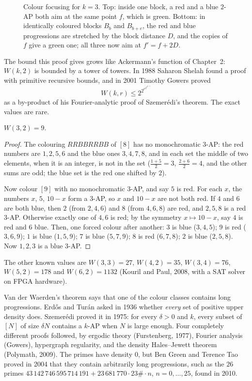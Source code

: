 \begin{figure}[ht]
\centering
{}
\caption{Colour focusing for $k=3$. Top: inside one block, a red and a blue $2$-AP both aim at the same point $f$, which is green. Bottom: in identically
coloured blocks $B_b$ and $B_{b+e}$, the red and blue progressions are stretched by the block distance $D$, and the copies of $f$ give a green one; all three now aim
at $f'=f+2D$.}
\label{extremal:fig:focusing}
\end{figure}

The bound this proof gives grows like Ackermann's function of Chapter~2: $W(k,2)$ is bounded by a tower of towers. In 1988 Saharon Shelah found a proof with
primitive recursive bounds, and in 2001 Timothy Gowers proved
\[
W(k,r)\le2^{2^{r^{2^{2^{k+9}}}}}
\]
as a by-product of his Fourier-analytic proof of Szemer\'edi's theorem. The exact values are rare.

\begin{proposition}\label{extremal:prop:w32}
$W(3,2)=9$.
\end{proposition}
\begin{proof}
The colouring $RRBBRRBB$ of $[8]$ has no monochromatic $3$-AP: the red numbers are $1,2,5,6$ and the blue ones $3,4,7,8$, and in each set the middle of two elements, when
it is an integer, is not in the set ($\frac{1+5}2=3$, $\frac{2+6}2=4$, and the other sums are odd; the blue set is the red one shifted by $2$).

Now colour $[9]$ with no monochromatic $3$-AP, and say $5$ is red. For each $x$, the numbers $x$, $5$, $10-x$ form a $3$-AP, so $x$ and $10-x$ are not both red. If $4$ and $6$ are
both blue, then $2$ (from $2,4,6$) and $8$ (from $4,6,8$) are red, and $2,5,8$ is a red $3$-AP. Otherwise exactly one of $4,6$ is red; by the symmetry $x\mapsto10-x$, say $4$
is red and $6$ blue. Then, one forced colour after another: $3$ is blue ($3,4,5$); $9$ is red ($3,6,9$); $1$ is blue ($1,5,9$); $7$ is blue ($5,7,9$); $8$ is red ($6,7,8$);
$2$ is blue ($2,5,8$). Now $1,2,3$ is a blue $3$-AP.
\end{proof}

The other known values are $W(3,3)=27$, $W(4,2)=35$, $W(3,4)=76$, $W(5,2)=178$ and $W(6,2)=1132$ (Kouril and Paul, 2008, with a SAT solver on FPGA hardware).

\begin{remark}
Van der Waerden's theorem says that one of the colour classes contains long progressions. Erd\H os and Tur\'an asked in 1936 whether \emph{every} set of positive upper density
does. Szemer\'edi proved it in 1975: for every $\delta>0$ and $k$, every subset of $[N]$ of size $\delta N$ contains a $k$-AP when $N$ is large enough. Four completely different
proofs followed, by ergodic theory (Furstenberg, 1977), Fourier analysis (Gowers), hypergraph regularity, and the density Hales--Jewett theorem (Polymath, 2009). The primes
have density $0$, but Ben Green and Terence Tao proved in 2004 that they contain arbitrarily long progressions, such as the $26$ primes
$43\,142\,746\,595\,714\,191+23\,681\,770\cdot23\#\cdot n$, $n=0,\dots,25$, found in 2010.
\end{remark}

